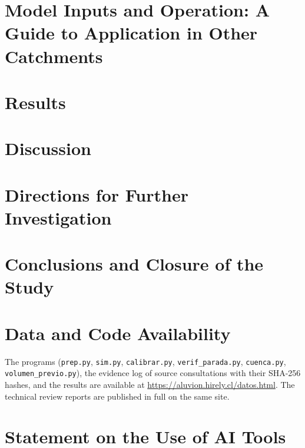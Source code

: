 \documentclass[10pt,a4paper]{article}
\begin{document}
\section{Model Inputs and Operation: A Guide to Application in Other Catchments}\label{sec:transferencia}


\section{Results}\label{sec:resultados}



\section{Discussion}\label{sec:discusion}


\section{Directions for Further Investigation}\label{sec:profundizacion}


\section{Conclusions and Closure of the Study}\label{sec:conclusiones}


\section*{Data and Code Availability}
The programs (\nolinkurl{prep.py}, \nolinkurl{sim.py}, \nolinkurl{calibrar.py}, \nolinkurl{verif_parada.py}, \nolinkurl{cuenca.py}, \nolinkurl{volumen_previo.py}), the evidence log of source consultations with their SHA-256 hashes, and the results are available at \url{https://aluvion.hirely.cl/datos.html}. The technical review reports are published in full on the same site.

\section*{Statement on the Use of AI Tools}\label{sec:declaracion-ia}




\clearpage\appendix

\end{document}
